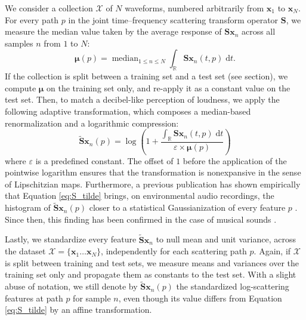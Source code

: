 \documentclass{bmcart}
\DeclareMathOperator*{\median}{median}
\newcommand{\lnameref}[1]{%
\bgroup
\let\nmu\MakeLowercase
\nameref{#1}\egroup}
\newcommand{\nmu}{}
\begin{document}
We consider a collection $\mathcal{X}$ of $N$ waveforms, numbered arbitrarily from $\boldsymbol{x}_1$ to $\boldsymbol{x}_N$. For every path $p$ in the joint time--frequency scattering transform operator $\mathbf{S}$, we measure the median value taken by the average response of $\mathbf{S}\boldsymbol{x}_n$ across all samples $n$ from $1$ to $N$:
\begin{equation}
\boldsymbol{\mu}(p) =
\median_{1\leq n \leq N}
\int_{\mathbb{R}} \mathbf{S}\boldsymbol{x}_n(t, p) \;\mathrm{d}t.
\end{equation}
If the collection is split between a training set and a test set (see \lnameref{sec:discussion} section), we compute $\boldsymbol{\mu}$ on the training set only, and re-apply it as a constant value on the test set.
Then, to match a decibel-like perception of loudness, we apply the following adaptive transformation, which composes a median-based renormalization and a logarithmic compression:
\begin{equation}
\mathbf{\widetilde{S}}\boldsymbol{x}_n (p) =
\log \left(
1 +
\dfrac{
\int_\mathbb{R} \mathbf{S}\boldsymbol{x}_n (t, p) \;\mathrm{d}t
}{\varepsilon \times \boldsymbol{\mu}(p)}
\right)
\label{eq:S_tilde}
\end{equation}
where $\varepsilon$ is a predefined constant.
The offset of $1$ before the application of the pointwise logarithm ensures that the transformation is nonexpansive in the sense of Lipschitzian maps.
Furthermore, a previous publication has shown empirically that Equation \ref{eq:S_tilde} brings, on environmental audio recordings, the histogram of $\mathbf{\widetilde{S}}\boldsymbol{x}_n (p)$ closer to a statistical Gaussianization of every feature $p$ \cite{lostanlen2018jasmp}.
Since then, this finding has been confirmed in the case of musical sounds \cite{lostanlen2018extended}.

Lastly, we standardize every feature $\mathbf{\widetilde{S}}\boldsymbol{x}_n$ to null mean and unit variance, across the dataset $\mathcal{X} = \{\boldsymbol{x}_1 \ldots \boldsymbol{x}_N\}$, independently for each scattering path $p$.
Again, if $\mathcal{X}$ is split between training and test sets, we measure means and variances over the training set only and propagate them as constants to the test set.
With a slight abuse of notation, we still denote by $\mathbf{\widetilde{S}}\boldsymbol{x}_n (p)$ the standardized log-scattering features at path $p$ for sample $n$, even though its value differs from Equation \ref{eq:S_tilde} by an affine transformation.
\end{document}
